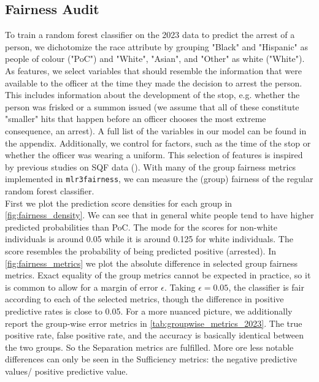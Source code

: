 \subsection{Fairness Audit}
To train a random forest classifier on the 2023 data to predict the arrest of a person, we dichotomize the race attribute by grouping "Black" and "Hispanic" as people of colour ("PoC") and "White", "Asian", and "Other" as white ("White").
As features, we select variables that should resemble the information that were available to the officer at the time they made the decision to arrest the person. This includes information about the development of the stop, e.g. whether the person was frisked or a summon issued (we assume that all of these constitute "smaller" hits that happen before an officer chooses the most extreme consequence, an arrest). A full list of the variables in our model can be found in the appendix.
Additionally, we control for factors, such as the time of the stop or whether the officer was wearing a uniform. This selection of features is inspired by previous studies on SQF data (\cite{Badr2022DTFANSP}). With many of the group fairness metrics implemented in \texttt{mlr3fairness}, we can measure the (group) fairness of the regular random forest classifier.\\
First we plot the prediction score densities for each group in \autoref{fig:fairness_density}. We can see that in general white people tend to have higher predicted probabilities than PoC. The mode for the scores for non-white individuals is around 0.05 while it is around 0.125 for white individuals. The score resembles the probability of being predicted positive (arrested).
In \autoref{fig:fairness_metrics} we plot the absolute difference in selected group fairness metrics.
Exact equality of the group metrics cannot be expected in practice, so it is common to allow for a margin of error $\epsilon$. Taking $\epsilon = 0.05$, the classifier is fair according to each of the selected metrics, though the difference in positive predictive rates is close to 0.05.
For a more nuanced picture, we additionally report the group-wise error metrics in \autoref{tab:groupwise_metrics_2023}.
The true positive rate, false positive rate, and the accuracy is basically identical between the two groups. So the Separation metrics are fulfilled. More ore less notable differences can only be seen in the Sufficiency metrics: the negative predictive values/ positive predictive value.


